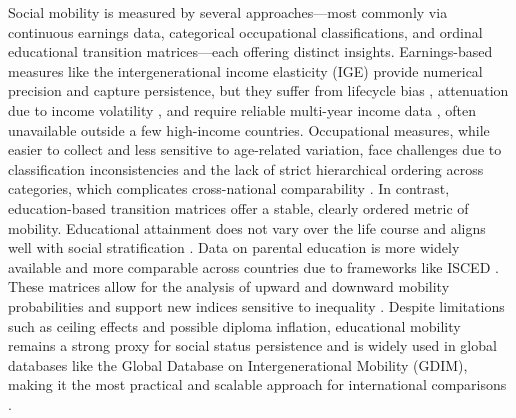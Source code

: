 Social mobility is measured by several approaches---most commonly via continuous earnings data, categorical occupational classifications, and ordinal educational transition matrices---each offering distinct insights. Earnings-based measures like the intergenerational income elasticity (IGE) provide numerical precision and capture persistence, but they suffer from lifecycle bias \citep{deutscher2023measuring}, attenuation due to income volatility \citep{clemente2025using}, and require reliable multi-year income data \citep{blanden2013cross}, often unavailable outside a few high-income countries. Occupational measures, while easier to collect and less sensitive to age-related variation, face challenges due to classification inconsistencies and the lack of strict hierarchical ordering across categories, which complicates cross-national comparability \citep{blanden2013cross}. In contrast, education-based transition matrices offer a stable, clearly ordered metric of mobility. Educational attainment does not vary over the life course and aligns well with social stratification \citep{van2024intergenerational}. Data on parental education is more widely available and more comparable across countries due to frameworks like ISCED \citep{narayan2018fair}. These matrices allow for the analysis of upward and downward mobility probabilities and support new indices sensitive to inequality \citep{apouey2023ordinal}. Despite limitations such as ceiling effects and possible diploma inflation, educational mobility remains a strong proxy for social status persistence and is widely used in global databases like the Global Database on Intergenerational Mobility (GDIM), making it the most practical and scalable approach for international comparisons \citep{narayan2018fair}.


